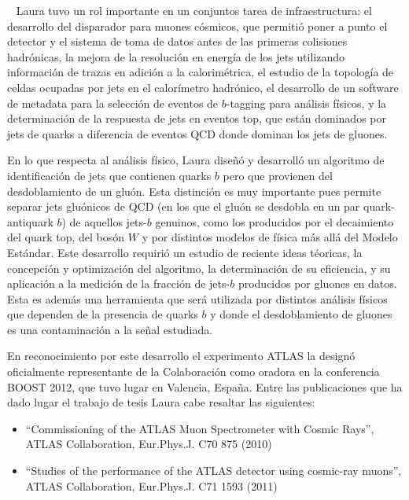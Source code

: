 \begin{letter}{\ }
Laura tuvo un rol importante en un conjuntos tarea de infraestructura: el
desarrollo del disparador para muones c\'osmicos, que permiti\'o poner a punto
el detector y el sistema de toma de datos antes de las primeras colisiones
hadr\'onicas, la mejora de la resoluci\'on en energ\'ia de los jets utilizando
informaci\'on de trazas en adici\'on a la calorim\'etrica, el estudio de la
topolog\'ia de celdas ocupadas por jets en el calor\'imetro hadr\'onico, el
desarrollo de un software de metadata para la selecci\'on %
de eventos de
$b$-tagging para an\'alisis f\'isicos, y la determinaci\'on de la respuesta de
jets en eventos top, que est\'an dominados por jets de quarks a diferencia de
eventos QCD donde dominan los jets de gluones.

En lo que respecta al an\'alisis f\'isico, Laura dise\~n\'o y desarroll\'o un
algoritmo de identificaci\'on de jets que contienen quarks $b$ pero que
provienen del desdoblamiento de un glu\'on. Esta distinci\'on es muy importante
pues permite separar jets glu\'onicos de QCD (en los que el glu\'on se desdobla en
un par quark-antiquark $b$) de aquellos jets-$b$ genuinos, como los producidos
por el decaimiento del quark top, del bos\'on $W$ y por distintos modelos de
f\'isica m\'as all\'a del Modelo Est\'andar. Este desarrollo requiri\'o un
estudio de reciente ideas t\'eoricas, la concepci\'on y optimizaci\'on del
algoritmo, la determinaci\'on de su eficiencia, y su aplicaci\'on a la
medici\'on de la fracci\'on de jets-$b$ producidos por gluones en datos. Esta
es adem\'as una herramienta que ser\'a utilizada por distintos an\'alisis
f\'isicos que dependen de la presencia de quarks $b$ y donde el desdoblamiento
de gluones es una contaminaci\'on a la se\~nal estudiada.

En reconocimiento por este desarrollo el experimento ATLAS la design\'o
oficialmente representante de la Colaboraci\'on como oradora en la conferencia
BOOST 2012, que tuvo lugar en Valencia, Espa\~na. Entre las publicaciones que
ha dado lugar el trabajo de tesis Laura cabe resaltar las siguientes:

\begin{itemize}

\item ``Commissioning of the ATLAS Muon Spectrometer with Cosmic Rays'', ATLAS Collaboration, Eur.Phys.J. C70 875 (2010)

\item ``Studies of the performance of the ATLAS detector using cosmic-ray muons'', ATLAS Collaboration, Eur.Phys.J. C71 1593 (2011)


\end{itemize}
\end{letter}
